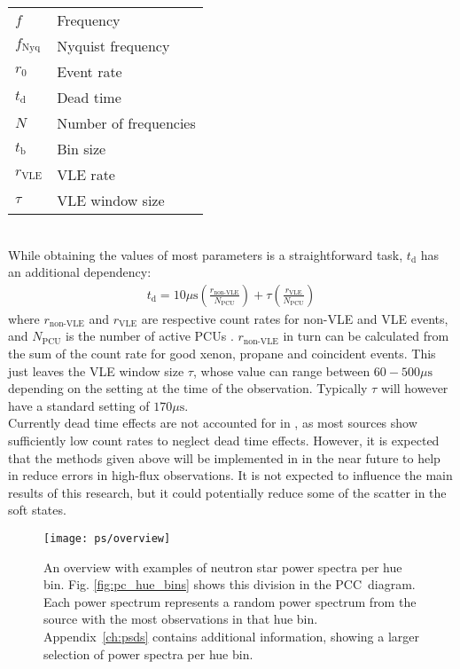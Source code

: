 \begin{tabular}{ll}
$f$		& Frequency \\
$f_\textrm{Nyq}$& Nyquist frequency \\
$r_0$		& Event rate \\
$t_\textrm{d}$	& Dead time \\
$N$		& Number of frequencies \\
$t_\textrm{b}$	& Bin size \\
$r_\textrm{VLE}$& \ac{VLE} rate\\
$\tau$		& \ac{VLE} window size \\
\end{tabular}\\

While obtaining the values of most parameters is a straightforward task, $t_\textrm{d}$ has an additional dependency:
\begin{align} 
t_\textrm{d} = 10 \mu\textrm{s} \left(\frac{r_\textrm{non-VLE}}{N_\textrm{PCU}} \right) + \tau\left( \frac{r_\textrm{VLE}}{N_\textrm{PCU}} \right)
\end{align}
where $r_\textrm{non-VLE}$ and $r_\textrm{VLE}$ are respective count rates for non-\ac{VLE} and \ac{VLE} events, and $N_\textrm{PCU}$ is the number of active \acp{PCU} \citep{rxtecookbookdeadtime}. $r_\textrm{non-VLE}$ in turn can be calculated from the sum of the count rate for good xenon, propane and coincident events. This just leaves the \ac{VLE} window size $\tau$, whose value can range between $60-500\mu\textrm{s}$ depending on the setting at the time of the observation. Typically $\tau$ will however have a standard setting of $170 \mu\textrm{s}$. \\

Currently dead time effects are not accounted for in \chromos, as most sources show sufficiently low count rates to neglect dead time effects. However, it is expected that the methods given above will be implemented in \chromos in the near future to help in reduce errors in high-flux observations. It is not expected to influence the main results of this research, but it could potentially reduce some of the scatter in the soft states.\\

\begin{landscape}
\begin{figure}[H]
	\myfloatalign
	{%
	\vspace*{-5cm}
	\hspace*{0.5cm}
	\texttt{[image: ps/overview]}}
	\caption[Overview power spectra]{An overview with examples of neutron star power spectra per hue bin. Fig. \ref{fig:pc_hue_bins} shows this division in the \ac{PCC}~diagram. Each power spectrum represents a random power spectrum from the source with the most observations in that hue bin. Appendix~\ref{ch:psds} contains additional information, showing a larger selection of power spectra per hue bin.}\label{fig:ps_overview}
\end{figure}
\end{landscape}
